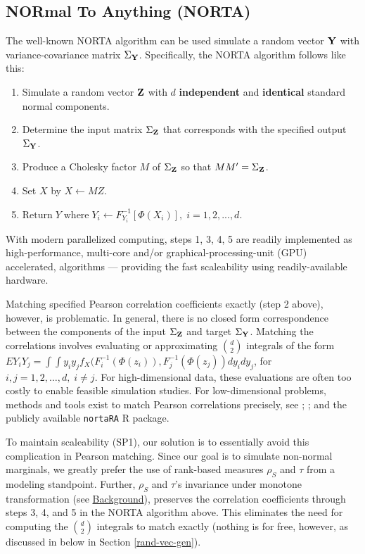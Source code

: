 \documentclass[]{article}
\providecommand{\tightlist}{%
  \setlength{\itemsep}{0pt}\setlength{\parskip}{0pt}}
\begin{document}
\hypertarget{normal-to-anything-norta}{%
\subsection{NORmal To Anything (NORTA)}\label{normal-to-anything-norta}}

The well-known NORTA algorithm \citep{Cario1997} can be used simulate a random vector \(\bf Y\) with variance-covariance matrix \(\Sigma_{\bf Y}\).
Specifically, the NORTA algorithm follows like this:

\begin{enumerate}
\def\labelenumi{\arabic{enumi}.}
\tightlist
\item
  Simulate a random vector \(\bf Z\) with \(d\) \textbf{independent} and \textbf{identical} standard normal components.
\item
  Determine the input matrix \(\Sigma_{\bf Z}\) that corresponds with the specified output \(\Sigma_{\bf Y}\).
\item
  Produce a Cholesky factor \(M\) of \(\Sigma_{\bf Z}\) so that \(M M^{\prime}=\Sigma_{\bf Z}\).
\item
  Set \(X\) by \(X \gets MZ\).
\item
  \(\text{Return} \; Y \; \text{where} \; Y_i \gets F_{Y_i}^{-1}[\Phi(X_i)], \; i=1,2,...,d\).
\end{enumerate}

With modern parallelized computing, steps 1, 3, 4, 5 are readily implemented as high-performance, multi-core and/or graphical-processing-unit (GPU) accelerated, algorithms --- providing the fast scaleability using readily-available hardware.

Matching specified Pearson correlation coefficients exactly (step 2 above), however, is problematic.
In general, there is no closed form correspondence between the components of the input \(\Sigma_{\bf Z}\) and target \(\Sigma_{\bf Y}\).
Matching the correlations involves evaluating or approximating \(\binom{d}{2}\) integrals of the form \(EY_iY_j = \int \int y_i y_j f_{X}(F_i^{-1}(\Phi(z_i)), F_j^{-1}(\Phi(z_j))dy_idy_j\), for \(i,j=1,2,\ldots,d, \; i \neq j\).
For high-dimensional data, these evaluations are often too costly to enable feasible simulation studies.
For low-dimensional problems, methods and tools exist to match Pearson correlations precisely, see \citet{Chen2001}; \citet{Xia17}; \citet{MB13} and the publicly available \texttt{nortaRA} R package.

To maintain scaleability (SP1), our solution is to essentially avoid this complication in Pearson matching.
Since our goal is to simulate non-normal marginals, we greatly prefer the use of rank-based measures \(\rho_S\) and \(\tau\) from a modeling standpoint.
Further, \(\rho_S\) and \(\tau\)'s invariance under monotone transformation (see \protect\hyperlink{background}{Background}), preserves the correlation coefficients through steps 3, 4, and 5 in the NORTA algorithm above.
This eliminates the need for computing the \(\binom{d}{2}\) integrals to match exactly (nothing is for free, however, as discussed in below in Section \ref{rand-vec-gen}).
\end{document}
